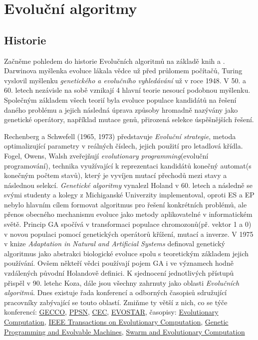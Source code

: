 \chapter{Evoluční algoritmy}
\section{Historie}
Začněme pohledem do historie Evolučních algoritmů na základě knih \cite{MitchellBook} a \cite{eibenIntro}. Darwinova myšlenka evoluce lákala vědce už před průlomem počítačů, Turing vyslovil myšlenku \textit{genetického a evolučního vyhledávání} už v roce 1948. V 50. a 60. letech nezávisle na sobě vznikají 4 hlavní teorie nesoucí podobnou myšlenku. Společným základem všech teorií byla evoluce populace kandidátů na řešení daného problému a jejich následná úprava způsoby hromadně nazývány jako genetické operátory, například mutace genů, přirozená selekce úspěšnějších řešení. \par 
Rechenberg a Schwefell (1965, 1973) představuje \textit{Evoluční strategie}, metoda optimalizující parametry v reálných číslech, jejich použití pro letadlová křídla. Fogel, Owens, Walsh zveřejňují \textit{evolutionary programming}(evoluční programování), technika využívající k reprezentaci kandidátů konečný automat(s konečným počtem stavů), který je vyvíjen mutací přechodů mezi stavy a následnou selekcí. \textit{Genetické algoritmy} vynalezl Holand v 60. letech a následně se svými studenty a kolegy z Michiganské Univerzity implementoval, oproti ES a EP nebylo hlavním cílem formovat algoritmus pro řešení konkrétních problémů, ale přenos obecného mechanismu evoluce jako metody aplikovatelné v informatickém světě. Princip GA spočívá v transformaci populace chromozonů(př. vektor 1 a 0) v novou populaci pomocí genetických operátorů křížení, mutací a inverze. V 1975 v knize \textit{Adaptation in Natural and  Artificial Systems} \cite{HolandBook} definoval genetický algoritmus jako abstrakci biologické evoluce spolu s teoretickým základem jejich používání. Ovšem někteří vědci používají pojem GA i ve významech hodně vzdálených původní Holandově definici. K sjednocení jednotlivých přístupů přispěl v 90. letehc Koza, dále jsou všechny zahrnuty jako oblasti \textit{Evolučních algoritmů}. Dnes existuje řada konferencí a odborných časopisů sdružující pracovníky zabývající se touto oblastí. Zmiňme ty větší z nich, co se týče konferencí: 
\href{http://gecco-2017.sigevo.org/index.html/HomePage}{GECCO}, \href{http://www.ppsn2016.org/conference}{PPSN}, 
\href{http://www.cec2017.org/}{CEC}, 
\href{http://www.evostar.org/2018/}{EVOSTAR}, 
časopisy: 
\href{http://www.mitpressjournals.org/loi/evco}{Evolutionary Computation}, 
\href{http://ieeexplore.ieee.org/xpl/RecentIssue.jsp?reload=true&punumber=4235}{IEEE Transactions on Evolutionary Computation}, 
\href{http://www.springer.com/computer/ai/journal/10710}{Genetic Programming and Evolvable Machines},
\href{https://www.journals.elsevier.com/swarm-and-evolutionary-computation/}{Swarm and Evolutionary Computation}
